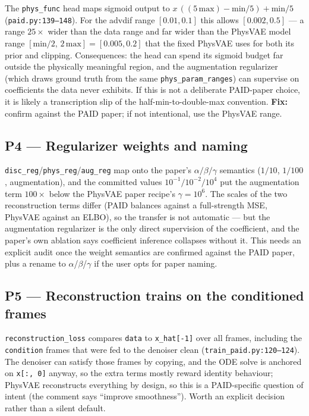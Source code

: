 \documentclass[11pt,a4paper]{article}
\newcommand{\code}[1]{\texttt{#1}}
\begin{document}
The \code{phys\_func} head maps sigmoid output to
$x\,((5\,\mathrm{max}) - \mathrm{min}/5) + \mathrm{min}/5$
(\code{paid.py:139--148}). For the advdif range $[0.01, 0.1]$ this allows
$[0.002, 0.5]$ --- a range $25\times$ wider than the data range and far wider than
the PhysVAE model range $[\mathrm{min}/2,\,2\,\mathrm{max}] = [0.005, 0.2]$ that
the fixed PhysVAE uses for both its prior and clipping. Consequences: the head can
spend its sigmoid budget far outside the physically meaningful region, and the
augmentation regularizer (which draws ground truth from the same
\code{phys\_param\_ranges}) can supervise on coefficients the data never
exhibits. If this is not a deliberate PAID-paper choice, it is likely a
transcription slip of the half-min-to-double-max convention. \textbf{Fix:} confirm
against the PAID paper; if not intentional, use the PhysVAE range.

\subsection*{P4 --- Regularizer weights and naming}

\code{disc\_reg}/\code{phys\_reg}/\code{aug\_reg} map onto the paper's
$\alpha/\beta/\gamma$ semantics ($1/10$, $1/100$, augmentation), and the committed
values $10^{-1}/10^{-2}/10^{4}$ put the augmentation term $100\times$ below the
PhysVAE paper recipe's $\gamma = 10^{6}$. The scales of the two reconstruction
terms differ (PAID balances against a full-strength MSE, PhysVAE against an
ELBO), so the transfer is not automatic --- but the augmentation regularizer is
the only direct supervision of the coefficient, and the paper's own ablation says
coefficient inference collapses without it. This needs an explicit audit once the
weight semantics are confirmed against the PAID paper, plus a rename to
$\alpha$/$\beta$/$\gamma$ if the user opts for paper naming.

\subsection*{P5 --- Reconstruction trains on the conditioned frames}

\code{reconstruction\_loss} compares \code{data} to \code{x\_hat[-1]} over all
frames, including the \code{condition} frames that were fed to the denoiser clean
(\code{train\_paid.py:120--124}). The denoiser can satisfy those frames by
copying, and the ODE solve is anchored on \code{x[:, 0]} anyway, so the extra
terms mostly reward identity behaviour; PhysVAE reconstructs everything by
design, so this is a PAID-specific question of intent (the comment says
``improve smoothness''). Worth an explicit decision rather than a silent
default.
\end{document}
